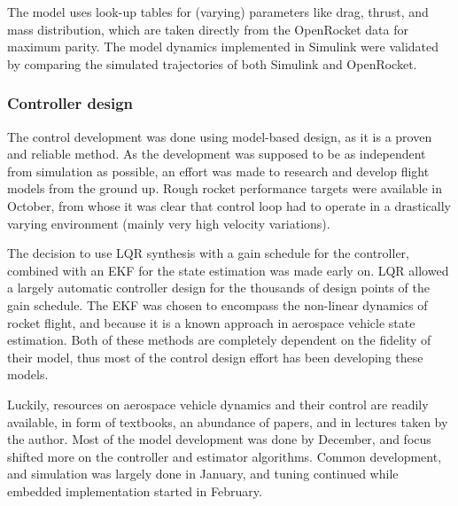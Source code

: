 The model uses look-up tables for (varying) parameters like drag, thrust, and mass distribution, which are taken directly from the OpenRocket data for maximum parity. 
The model dynamics implemented in Simulink were validated by comparing the simulated trajectories of both Simulink and OpenRocket.

\subsubsection*{Controller design}

The control development was done using model-based design, as it is a proven and reliable method.
As the development was supposed to be as independent from simulation as possible, an effort was made to research and develop flight models from the ground up.
Rough rocket performance targets were available in October, from whose it was clear that control loop had to operate in a drastically varying environment (mainly very high velocity variations).

The decision to use LQR synthesis with a gain schedule for the controller, combined with an EKF for the state estimation was made early on.
LQR allowed a largely automatic controller design for the thousands of design points of the gain schedule.
The EKF was chosen to encompass the non-linear dynamics of rocket flight, and because it is a known approach in aerospace vehicle state estimation.
Both of these methods are completely dependent on the fidelity of their model, thus most of the control design effort has been developing these models.

Luckily, resources on aerospace vehicle dynamics and their control are readily available, in form of textbooks, an abundance of papers, and in lectures taken by the author.
Most of the model development was done by December, and focus shifted more on the controller and estimator algorithms. 
Common development, and simulation was largely done in January, and tuning continued while embedded implementation started in February.
